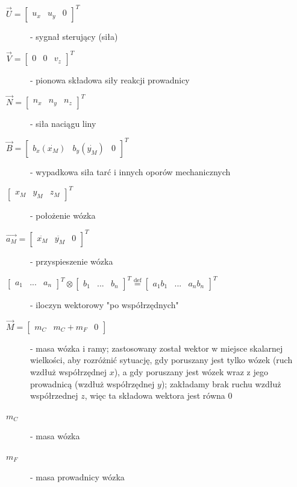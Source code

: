 \documentclass[10pt]{article}
\begin{document}
\begin{description}
\item[$\vec{U} = \begin{bmatrix} u_x & u_y & 0 \end{bmatrix}^T$] - sygnał sterujący (siła)
\item[$\vec{V} = \begin{bmatrix} 0 & 0 & v_z \end{bmatrix}^T$] - pionowa składowa siły reakcji prowadnicy
\item[$\vec{N} = \begin{bmatrix} n_x & n_y & n_z \end{bmatrix}^T$] - siła naciągu liny
\item[$\vec{B} = \begin{bmatrix} b_x (\dot{x_M}) & b_y (\dot{y_M}) & 0 \end{bmatrix}^T$] - wypadkowa siła tarć i innych oporów mechanicznych
\item[$\begin{bmatrix} x_M & y_M & z_M \end{bmatrix}^T$] - położenie wózka
\item[$\vec{a_M} = \begin{bmatrix} \ddot{x_M} & \ddot{y_M} & 0 \end{bmatrix}^T$] - przyspieszenie wózka
\item[$\begin{bmatrix} a_1 & ... & a_n \end{bmatrix}^T \otimes \begin{bmatrix} b_1 & ... & b_n \end{bmatrix}^T \stackrel{\text{def}}{=} \begin{bmatrix} a_1b_1 & ... & a_n b_n \end{bmatrix}^T$] - iloczyn wektorowy "po współrzędnych"
\item[$\vec{M} = \begin{bmatrix} m_C & m_C + m_F & 0 \end{bmatrix}$] - masa wózka i ramy; zastosowany został wektor w miejsce skalarnej wielkości, aby rozróżnić sytuację, gdy poruszany jest tylko wózek (ruch wzdłuż współrzędnej $x$), a gdy poruszany jest wózek wraz z jego prowadnicą (wzdłuż współrzędnej $y$); zakładamy brak ruchu wzdłuż współrzednej $z$, więc ta składowa wektora jest równa $0$
\item[$m_C$] - masa wózka
\item[$m_F$] - masa prowadnicy wózka
\end{description}
\end{document}
